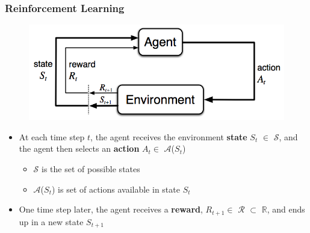 \documentclass{beamer}
\begin{document}
\begin{frame}
\frametitle{Reinforcement Learning}

\begin{figure}[t]
\includegraphics[scale=0.3]{AgentEnvironment}
\centering
\end{figure}

\begin{itemize}
\item At each time step $t$, the agent receives the environment \textbf{state} $S_t$ $\in$ $\mathscr{S}$, 
 and the agent then selects an \textbf{action} $A_t \in$ $\mathscr{A}$($S_t$) 
   \begin{itemize}
   	\item $\mathscr{S}$ is the set of possible states
        \item $\mathscr{A}$($S_t$) is set of actions available in state $S_t$
      \end{itemize}
\item One time step later, the agent receives a \textbf{reward}, $R_{t+1} \in$ $\mathscr{R}$ $\subset$ $\mathbb{R}$,
and ends up in a new state $S_{t+1}$
\end{itemize}
\end{frame}

\end{document}
